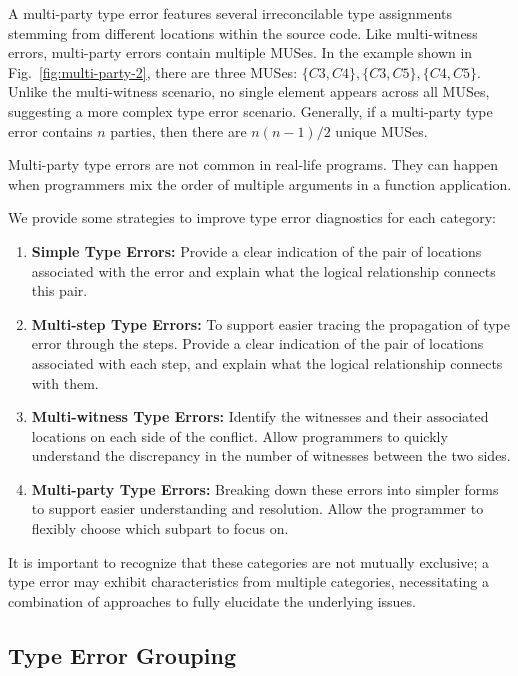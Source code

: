 \documentclass[pdflatex,lineno,sn-nature,Numbered]{sn-jnl}%
\begin{document}
  A multi-party type error features several irreconcilable type assignments stemming from different locations within the source code. Like multi-witness errors, multi-party errors contain multiple MUSes. In the example shown in Fig.~\ref{fig:multi-party-2}, there are three MUSes: $\{C3, C4\}, \{C3, C5\}, \{C4, C5\}$. Unlike the multi-witness scenario, no single element appears across all MUSes, suggesting a more complex type error scenario. Generally, if a multi-party type error contains $n$ parties, then there are $n (n - 1) / 2$ unique MUSes.

Multi-party type errors are not common in real-life programs. They can happen when programmers mix the order of multiple arguments in a function application.  
  
We provide some strategies to improve type error diagnostics for each category:

\begin{enumerate}
  \item {
    \textbf{Simple Type Errors:}  Provide a clear indication of the pair of locations associated with the error and explain what the logical relationship connects this pair.
  }
  
  \item {
    \textbf{Multi-step Type Errors:} To support easier tracing the propagation of type error through the steps. Provide a clear indication of the pair of locations associated with each step, and explain what the logical relationship connects with them.
  }
  \item {
    \textbf{Multi-witness Type Errors:} Identify the witnesses and their associated locations on each side of the conflict. Allow programmers to quickly understand the discrepancy in the number of witnesses between the two sides.
  }
  \item {
    \textbf{Multi-party Type Errors:} Breaking down these errors into simpler forms to support easier understanding and resolution. Allow the programmer to flexibly choose which subpart to focus on.
  }
\end{enumerate}

It is important to recognize that these categories are not mutually exclusive; a type error may exhibit characteristics from multiple categories, necessitating a combination of approaches to fully elucidate the underlying issues.

\subsection{Type Error Grouping} \label{sub:grouping}
\end{document}
